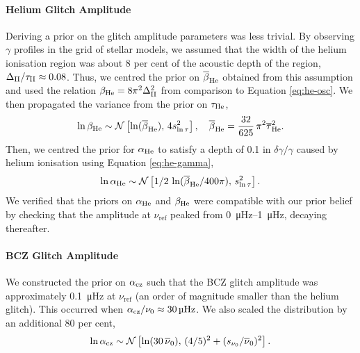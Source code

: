 \paragraph{Helium Glitch Amplitude} Deriving a prior on the glitch amplitude parameters was less trivial. By observing \(\gamma\) profiles in the grid of stellar models, we assumed that the width of the helium ionisation region was about 8 per cent of the acoustic depth of the region, \(\Delta_{{\mathrm{II}}}/\tau_{{\mathrm{II}}} \approx 0.08\). Thus, we centred the prior on \(\overline{\beta}_{{\mathrm{He}}}\) obtained from this assumption and used the relation \(\beta_{{\mathrm{He}}} = 8\pi^2\Delta_{{\mathrm{II}}}^2\) from comparison to Equation \ref{eq:he-osc}. We then propagated the variance from the prior on \(\tau_{{\mathrm{He}}}\),
%
\begin{equation}
    \ln\beta_{{\mathrm{He}}} \sim \mathcal{N}\left[ \ln(\overline{\beta}_{{\mathrm{He}}}), \, 4 s_{\ln\tau}^2 \right], \quad \overline{\beta}_{{\mathrm{He}}} = \frac{32}{625} \, \pi^2 \overline{\tau}_{{\mathrm{He}}}^2.
\end{equation}
%
Then, we centred the prior for \(\alpha_{{\mathrm{He}}}\) to satisfy a depth of 0.1 in \(\delta\gamma/\gamma\) caused by helium ionisation using Equation \ref{eq:he-gamma},
%
\begin{gather}
    \ln\alpha_{{\mathrm{He}}} \sim \mathcal{N}\left[ 1/2 \, \ln({\overline{\beta}_{{\mathrm{He}}}}/{400\pi}), \, s_{\ln\tau}^2 \right].
\end{gather}
%
We verified that the priors on \(\alpha_{{\mathrm{He}}}\) and \(\beta_{{\mathrm{He}}}\) were compatible with our prior belief by checking that the amplitude at \(\nu_\mathrm{ref}\) peaked from \SIrange{0}{1}{\micro\hertz}, decaying thereafter.

\paragraph{BCZ Glitch Amplitude} We constructed the prior on \(\alpha_{{\mathrm{cz}}}\) such that the BCZ glitch amplitude was approximately \SI{0.1}{\micro\hertz} at \(\nu_\mathrm{ref}\) (an order of magnitude smaller than the helium glitch). This occurred when \(\alpha_{{\mathrm{cz}}}/\nu_0 \approx \SI{30}{\micro\hertz}\). We also scaled the distribution by an additional 80 per cent,
%
\begin{equation*}
    \ln\alpha_{{\mathrm{cz}}} \sim \mathcal{N}\left[ \ln(30\,\overline{\nu}_0), \, (4/5)^2 + (s_{\nu_0}/\overline{\nu}_0)^2\right].
\end{equation*}
%

%     

